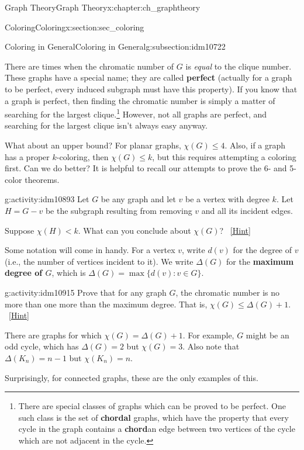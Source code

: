 \documentclass[oneside,10pt,]{book}
\newcommand{\terminology}[1]{\textbf{#1}}
\numberwithin{equation}{chapter}
\def\st{:}
\newcommand{\lt}{<}
\begin{document}
\begin{chapterptx}{Graph Theory}{}{Graph Theory}{}{}{x:chapter:ch_graphtheory}
\begin{sectionptx}{Coloring}{}{Coloring}{}{}{x:section:sec_coloring}
\begin{subsectionptx}{Coloring in General}{}{Coloring in General}{}{}{g:subsection:idm10722}
\par
There are times when the chromatic number of \(G\) is \emph{equal} to the clique number. These graphs have a special name; they are called \terminology{perfect} (actually for a graph to be perfect, every induced subgraph must have this property). If you know that a graph is perfect, then finding the chromatic number is simply a matter of searching for the largest clique.\footnote{There are special classes of graphs which can be proved to be perfect.  One such class is the set of \terminology{chordal} graphs, which have the property that every cycle in the graph contains a \terminology{chord}\textemdash{}an edge between two vertices of the cycle which are not adjacent in the cycle.\label{g:fn:idm10885}} However, not all graphs are perfect, and searching for the largest clique isn't always easy anyway.%
\par
What about an upper bound?  For planar graphs, \(\chi(G) \le 4\).  Also, if a graph has a proper \(k\)-coloring, then \(\chi(G) \le k\), but this requires attempting a coloring first.  Can we do better? It is helpful to recall our attempts to prove the 6- and 5-color theorems.%
\begin{activity}{}{g:activity:idm10893}%
Let \(G\) be any graph and let \(v\) be a vertex with degree \(k\).  Let \(H = G - v\) be the subgraph resulting from removing \(v\) and all its incident edges.%
\par
Suppose \(\chi(H) \lt k\).  What can you conclude about \(\chi(G)\)?%
\qquad~\hfill{\tiny\hyperlink{g:hint:idm10904-back}{[Hint]}}\end{activity}
Some notation will come in handy.  For a vertex \(v\), write \(d(v)\) for the degree of \(v\) (i.e., the number of vertices incident to it).  We write \(\Delta(G)\) for the \terminology{maximum degree of \(G\)}, which is \(\Delta(G) = \max\{d(v) \st v \in G\}\).%
\begin{activity}{}{g:activity:idm10915}%
Prove that for any graph \(G\), the chromatic number is no more than one more than the maximum degree.  That is, \(\chi(G) \le \Delta(G) + 1\).%
\qquad~\hfill{\tiny\hyperlink{g:hint:idm10920-back}{[Hint]}}\end{activity}
There are graphs for which \(\chi(G) = \Delta(G) + 1\).  For example, \(G\) might be an odd cycle, which has \(\Delta(G) = 2\) but \(\chi(G) = 3\).  Also note that \(\Delta(K_n) = n-1\) but \(\chi(K_n) = n\).%
\par
Surprisingly, for connected graphs, these are the only examples of this.%

\end{subsectionptx}
\end{sectionptx}
\end{chapterptx}
\end{document}
